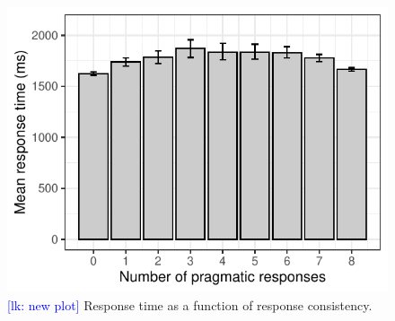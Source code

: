 \documentclass[10pt,letterpaper]{article}
\newcommand{\jd}[1]{\textcolor{Red}{[jd: #1]}}
\newcommand{\lk}[1]{\textcolor{Blue}{[lk: #1]}}
\begin{document}
\begin{figure}
  \centering
    \includegraphics[width=\columnwidth]{plots/consistency}
    \caption{\lk{new plot} Response time as a function of response consistency.}
    \label{fig:consistency}
  \end{figure}



\end{document}
